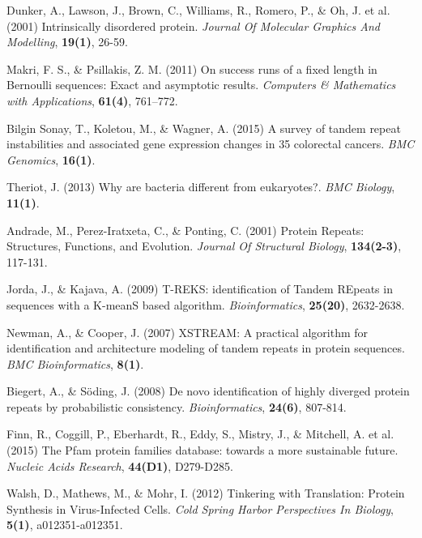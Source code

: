 \documentclass[a4,center,fleqn]{NAR}
\begin{document}
\begin{thebibliography}{4}
Dunker, A., Lawson, J., Brown, C., Williams, R., Romero, P., \& Oh, J. et al. (2001)
Intrinsically disordered protein. 
\textit{Journal Of Molecular Graphics And Modelling}, \textbf{19(1)}, 26-59.

Makri, F. S., \& Psillakis, Z. M. (2011)
On success runs of a fixed length in Bernoulli sequences: Exact and asymptotic results. 
\textit{Computers \& Mathematics with Applications}, \textbf{61(4)}, 761–772.

Bilgin Sonay, T., Koletou, M., \& Wagner, A. (2015)
A survey of tandem repeat instabilities and associated gene expression changes in 35 colorectal cancers. 
\textit{BMC Genomics}, \textbf{16(1)}. 

Theriot, J. (2013)
Why are bacteria different from eukaryotes?. 
\textit{BMC Biology}, \textbf{11(1)}. 

Andrade, M., Perez-Iratxeta, C., \& Ponting, C. (2001)
Protein Repeats: Structures, Functions, and Evolution. 
\textit{Journal Of Structural Biology}, \textbf{134(2-3)}, 117-131. 

Jorda, J., \& Kajava, A. (2009)
T-REKS: identification of Tandem REpeats in sequences with a K-meanS based algorithm. 
\textit{Bioinformatics}, \textbf{25(20)}, 2632-2638. 

Newman, A., \& Cooper, J. (2007)
XSTREAM: A practical algorithm for identification and architecture modeling of tandem repeats in protein sequences. 
\textit{BMC Bioinformatics}, \textbf{8(1)}. 

Biegert, A., \& S\"oding, J. (2008)
De novo identification of highly diverged protein repeats by probabilistic consistency. 
\textit{Bioinformatics}, \textbf{24(6)}, 807-814. 

Finn, R., Coggill, P., Eberhardt, R., Eddy, S., Mistry, J., \& Mitchell, A. et al. (2015)
The Pfam protein families database: towards a more sustainable future. 
\textit{Nucleic Acids Research}, \textbf{44(D1)}, D279-D285. 

Walsh, D., Mathews, M., \& Mohr, I. (2012)
Tinkering with Translation: Protein Synthesis in Virus-Infected Cells. 
\textit{Cold Spring Harbor Perspectives In Biology}, \textbf{5(1)}, a012351-a012351. 


\end{thebibliography}
\end{document}
